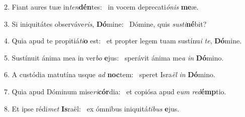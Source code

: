 2. Fiant aures tuæ in\textit{ten}\textbf{dén}tes: \ast\  in vocem deprecati\textit{ó}\textit{nis} \textbf{me}æ.\

3. Si iniquitátes observáve\textit{ris}, \textbf{Dó}mine: \ast\  Dómine, quis \textit{sus}\textit{ti}\textbf{né}bit?\

4. Quia apud te propitiá\textit{ti}\textbf{o} est: \ast\  et propter legem tuam sustínu\textit{i} \textit{te}, \textbf{Dó}mine.\

5. Sustínuit ánima mea in ver\textit{bo} \textbf{e}jus: \ast\  sperávit ánima me\textit{a} \textit{in} \textbf{Dó}mino.\

6. A custódia matutína usque \textit{ad} \textbf{noc}tem: \ast\  speret Isra\textit{ël} \textit{in} \textbf{Dó}mino.\

7. Quia apud Dóminum mise\textit{ri}\textbf{cór}dia: \ast\  et copiósa apud e\textit{um} \textit{red}\textbf{émp}tio.\

8. Et ipse rédi\textit{met} \textbf{Is}raël: \ast\  ex ómnibus iniquitá\textit{ti}\textit{bus} \textbf{e}jus.\

